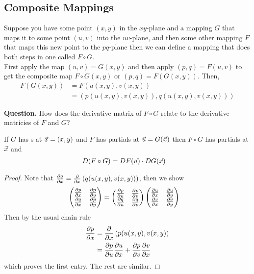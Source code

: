 \documentclass[english, 11pt]{article}
\begin{document}
\subsection{Composite Mappings}

Suppose you have some point $(x,y)$ in the $xy$-plane and a mapping $G$ that maps it to some point $(u,v)$ into the $uv$-plane, and then some other mapping $F$ that maps this new point to the $pq$-plane then we can define a mapping that does both steps in one called $F \circ G$. \\

First apply the map $(u,v) = G(x,y)$ and then apply $(p,q) = F(u,v)$ to get the composite map $F\circ G(x,y)$ or $(p,q) = F(G(x,y))$. Then,
\begin{align*}
  F(G(x,y)) & = F(u(x,y), v(x,y)) \\
            & = (p(u(x,y), v(x,y)), q(u(x,y), v(x,y)))
\end{align*}

\textbf{Question.} How does the derivative matrix of $F\circ G$ relate to the derivative matricies of $F$ and $G$?

\begin{thrm}\label{chainrulemtx}
If $G$ has  s at $\vec{x} = (x,y)$ and $F$ has  partials at $\vec{u} = G(\vec{x})$ then $F\circ G$ has  partials at $\vec{x}$ and
\begin{align*}
  D(F\circ G) & = DF(\vec{u}) \cdot DG(\vec{x})
\end{align*}
\end{thrm}
\begin{proof}
  Note that $\frac{\partial q}{\partial x} = \frac{\partial}{\partial x} \left( q(u(x,y), v(x,y)) \right)$, then we show
  \begin{align*}
    \left( \begin{matrix}  \frac{\partial p}{\partial x} & \frac{\partial p}{\partial y} \\ \frac{\partial q}{\partial x} & \frac{\partial p}{\partial y} \end{matrix} \right) & = \left( \begin{matrix} \frac{\partial p}{\partial u} & \frac{\partial p}{\partial v} \\ \frac{\partial q}{\partial u} & \frac{\partial q}{\partial v} \end{matrix} \right) \left( \begin{matrix} \frac{\partial u}{\partial x} & \frac{\partial u}{\partial y} \\ \frac{\partial v}{\partial x} & \frac{\partial v}{\partial y} \end{matrix} \right)
  \end{align*}
  Then by the usual chain rule
  \begin{align*}
    \frac{\partial p}{\partial x} & = \frac{\partial}{\partial x} \left( p(u(x,y), v(x,y) \right) \\
    & = \frac{\partial p}{\partial u} \frac{\partial u}{\partial x} + \frac{\partial p}{\partial v} \frac{\partial v}{\partial x}
  \end{align*}
  which proves the first entry. The rest are similar.
\end{proof}
\end{document}
